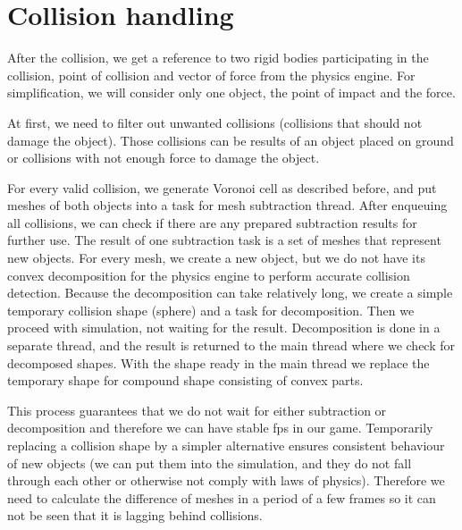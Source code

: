 \section{Collision handling}
\label{sec:collisions}
After the collision, we get a reference to two rigid bodies participating in the collision, point of collision and vector of force from the physics engine. For simplification, we will consider only one object, the point of impact and the force.

At first, we need to filter out unwanted collisions (collisions that should not damage the object). Those collisions can be results of an object placed on ground or collisions with not enough force to damage the object. 

For every valid collision, we generate Voronoi cell as described before, and put  meshes of both objects into a task for mesh subtraction thread. After enqueuing all collisions, we can check if there are any prepared subtraction results for further use. The result of one subtraction task is a set of meshes that represent new objects. For every mesh, we create a new object, but we do not have its convex decomposition for the physics engine to perform accurate collision detection. Because the decomposition can take relatively long, we create a simple temporary collision shape (\eg sphere) and a task for decomposition. Then we proceed with simulation, not waiting for the result. Decomposition is done in a separate thread, and the result is returned to the main thread where we check for decomposed shapes. With the shape ready in the main thread we replace the temporary shape for compound shape consisting of convex parts.

This process guarantees that we do not wait for either subtraction or decomposition and therefore we can have stable fps in our game. Temporarily replacing a collision shape by a simpler alternative ensures consistent behaviour of new objects (we can put them into the simulation, and they do not fall through each other or otherwise not comply with laws of physics). Therefore we need to calculate the difference of meshes in a period of a few frames so it can not be seen that it is lagging behind collisions.

